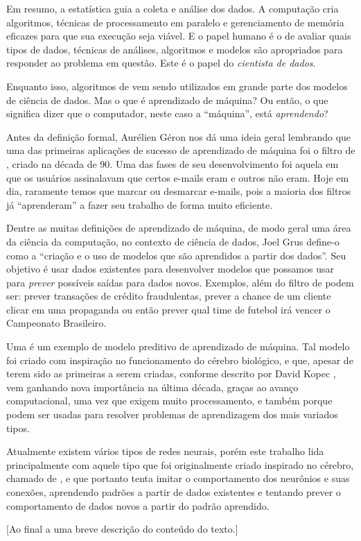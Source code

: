 Em resumo, a estatística guia a coleta e análise dos dados. A computação cria algoritmos, técnicas de processamento em paralelo e gerenciamento de memória eficazes para que sua execução seja viável. E o papel humano é o de avaliar quais tipos de dados, técnicas de análises, algoritmos e modelos são apropriados para responder ao problema em questão. Este é o papel do \emph{cientista de dados}.

Enquanto isso, algoritmos de  vem sendo utilizados em grande parte dos modelos de ciência de dados. Mas o que é aprendizado de máquina? Ou então, o que significa dizer que o computador, neste caso a ``máquina'', está \emph{aprendendo}?

Antes da definição formal, Aurélien Géron \citep{hands} nos dá uma ideia geral lembrando que uma das primeiras aplicações de sucesso de aprendizado de máquina foi o filtro de , criado na década de 90. Uma das fases de seu desenvolvimento foi aquela em que os usuários assinalavam que certos e-mails eram  e outros não eram. Hoje em dia, raramente temos que marcar ou desmarcar e-mails, pois a maioria dos filtros já ``aprenderam'' a fazer seu trabalho de forma muito eficiente.

Dentre as muitas definições de aprendizado de máquina, de modo geral uma área da ciência da computação, no contexto de ciência de dados, Joel Grus \citep{data} define-o como a ``criação e o uso de modelos que são aprendidos a partir dos dados''. Seu objetivo é usar dados existentes para desenvolver modelos que possamos usar para \emph{prever} possíveis saídas para dados novos. Exemplos, além do filtro de  podem ser: prever transações de crédito fraudulentas, prever a chance de um cliente clicar em uma propaganda ou então prever qual time de futebol irá vencer o Campeonato Brasileiro.

Uma  é um exemplo de modelo preditivo de aprendizado de máquina. Tal modelo foi criado com inspiração no funcionamento do cérebro biológico, e que, apesar de terem sido as primeiras a serem criadas, conforme descrito por David Kopec \citep{classic}, vem ganhando nova importância na última década, graças ao avanço computacional, uma vez que exigem muito processamento, e também porque podem ser usadas para resolver problemas de aprendizagem dos mais variados tipos.

Atualmente existem vários tipos de redes neurais, porém este trabalho lida principalmente com aquele tipo que foi originalmente criado inspirado no cérebro, chamado de , e que portanto tenta imitar o comportamento dos neurônios e suas conexões, aprendendo padrões a partir de dados existentes e tentando prever o comportamento de dados novos a partir do padrão aprendido.

[Ao final a uma breve descrição do conteúdo do texto.]
